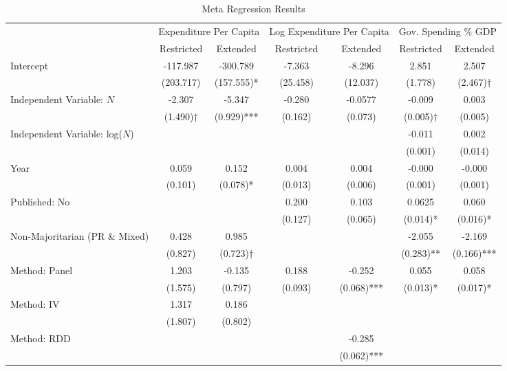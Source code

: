\documentclass[a4paper,12pt]{article}
\begin{document}
\begin{table}[htpb]
\footnotesize
\caption{Meta Regression Results}
\label{tab:regressions}
\centering
\begin{tabular}{lcccccc}
\toprule
\midrule
\multicolumn{1}{c}{ } & \multicolumn{2}{c}{Expenditure Per Capita} & \multicolumn{2}{c}{Log Expenditure Per Capita} & \multicolumn{2}{c}{Gov. Spending \% GDP} \\
\cmidrule(l{3pt}r{3pt}){2-3} \cmidrule(l{3pt}r{3pt}){4-5} \cmidrule(l{3pt}r{3pt}){6-7}
& Restricted & Extended & Restricted & Extended & Restricted & Extended \\
\midrule
Intercept & -117.987 & -300.789 & -7.363 & -8.296 & 2.851 & 2.507\\
          & (203.717) & (157.555)* & (25.458) & (12.037) & (1.778) & (2.467)$\dagger$\\
%
Independent Variable: $N$ & -2.307 & -5.347 &  -0.280 &  -0.0577 &-0.009 & 0.003\\
                          & (1.490)$\dagger$ & (0.929)*** & (0.162) & (0.073) & (0.005)$\dagger$ & (0.005)\\
%
Independent Variable: log($N$) &  &  &  &  &-0.011& 0.002\\
                               &  &  &  &  & (0.001) & (0.014)\\
%
Year & 0.059 & 0.152 &  0.004 &  0.004 &-0.000& -0.000\\
     & (0.101) & (0.078)* & (0.013) & (0.006) & (0.001) & (0.001)\\
%
Published: No &  &  & 0.200 &  0.103 & 0.0625 & 0.060\\
              &  &  & (0.127) & (0.065) & (0.014)* & (0.016)*\\
%
Non-Majoritarian (PR \& Mixed) & 0.428 & 0.985 & &  & -2.055 & -2.169\\
                               & (0.827) & (0.723)$\dagger$ & &  & (0.283)** & (0.166)***\\
%
Method: Panel & 1.203 & -0.135 & 0.188 & -0.252 & 0.055 & 0.058\\
              & (1.575) & (0.797) & (0.093) & (0.068)*** & (0.013)* & (0.017)*\\
%
Method: IV & 1.317 & 0.186 &  &  &  & \\
           & (1.807) & (0.802) &  &  &  & \\
%
Method: RDD &  &  &  &-0.285&  & \\
            &  &  &  & (0.062)*** &  & \\
% 
\bottomrule
\end{tabular}
\begin{minipage}{\textwidth}
\renewcommand{\footnoterule}{}
\end{minipage}
\end{table}
\end{document}

